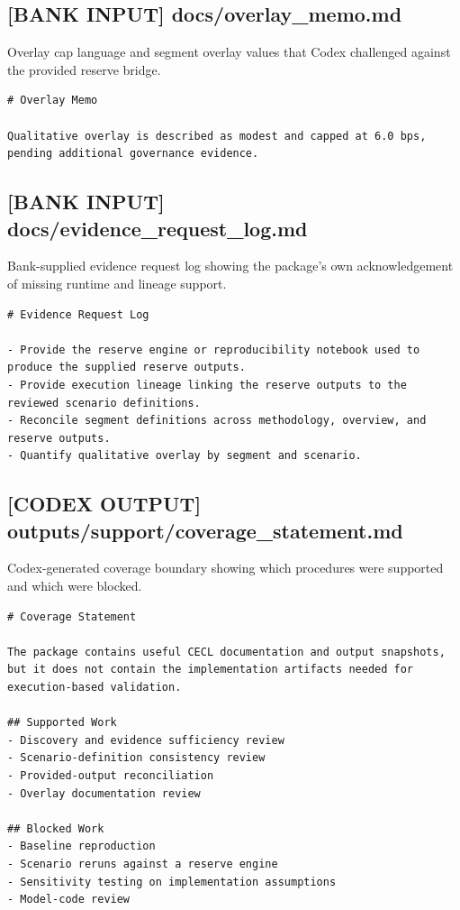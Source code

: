\documentclass[11pt]{article}
\begin{document}
\subsection*{[BANK INPUT] docs/overlay\_memo.md}
Overlay cap language and segment overlay values that Codex challenged against the provided reserve bridge.
\begin{Verbatim}[fontsize=\small]
# Overlay Memo

Qualitative overlay is described as modest and capped at 6.0 bps, pending additional governance evidence.
\end{Verbatim}
\subsection*{[BANK INPUT] docs/evidence\_request\_log.md}
Bank-supplied evidence request log showing the package's own acknowledgement of missing runtime and lineage support.
\begin{Verbatim}[fontsize=\small]
# Evidence Request Log

- Provide the reserve engine or reproducibility notebook used to produce the supplied reserve outputs.
- Provide execution lineage linking the reserve outputs to the reviewed scenario definitions.
- Reconcile segment definitions across methodology, overview, and reserve outputs.
- Quantify qualitative overlay by segment and scenario.
\end{Verbatim}
\subsection*{[CODEX OUTPUT] outputs/support/coverage\_statement.md}
Codex-generated coverage boundary showing which procedures were supported and which were blocked.
\begin{Verbatim}[fontsize=\small]
# Coverage Statement

The package contains useful CECL documentation and output snapshots, but it does not contain the implementation artifacts needed for execution-based validation.

## Supported Work
- Discovery and evidence sufficiency review
- Scenario-definition consistency review
- Provided-output reconciliation
- Overlay documentation review

## Blocked Work
- Baseline reproduction
- Scenario reruns against a reserve engine
- Sensitivity testing on implementation assumptions
- Model-code review
\end{Verbatim}
\end{document}
